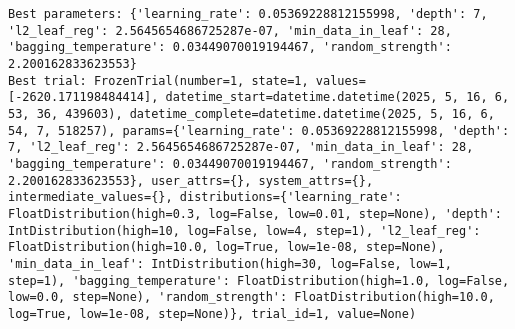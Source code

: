 \documentclass[
  letterpaper,
  DIV=11,
  numbers=noendperiod]{scrreprt}
\begin{document}
\begin{verbatim}
Best parameters: {'learning_rate': 0.05369228812155998, 'depth': 7, 'l2_leaf_reg': 2.5645654686725287e-07, 'min_data_in_leaf': 28, 'bagging_temperature': 0.03449070019194467, 'random_strength': 2.200162833623553}
Best trial: FrozenTrial(number=1, state=1, values=[-2620.171198484414], datetime_start=datetime.datetime(2025, 5, 16, 6, 53, 36, 439603), datetime_complete=datetime.datetime(2025, 5, 16, 6, 54, 7, 518257), params={'learning_rate': 0.05369228812155998, 'depth': 7, 'l2_leaf_reg': 2.5645654686725287e-07, 'min_data_in_leaf': 28, 'bagging_temperature': 0.03449070019194467, 'random_strength': 2.200162833623553}, user_attrs={}, system_attrs={}, intermediate_values={}, distributions={'learning_rate': FloatDistribution(high=0.3, log=False, low=0.01, step=None), 'depth': IntDistribution(high=10, log=False, low=4, step=1), 'l2_leaf_reg': FloatDistribution(high=10.0, log=True, low=1e-08, step=None), 'min_data_in_leaf': IntDistribution(high=30, log=False, low=1, step=1), 'bagging_temperature': FloatDistribution(high=1.0, log=False, low=0.0, step=None), 'random_strength': FloatDistribution(high=10.0, log=True, low=1e-08, step=None)}, trial_id=1, value=None)
\end{verbatim}
\end{document}
